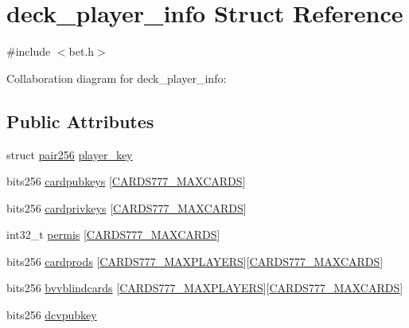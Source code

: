\hypertarget{structdeck__player__info}{}\section{deck\+\_\+player\+\_\+info Struct Reference}
\label{structdeck__player__info}


{\ttfamily \#include $<$bet.\+h$>$}



Collaboration diagram for deck\+\_\+player\+\_\+info\+:
\subsection*{Public Attributes}
\begin{DoxyCompactItemize}
\item 
struct \hyperlink{structpair256}{pair256} \hyperlink{structdeck__player__info_a69c860bb618326b42649fb8dc874b19a}{player\+\_\+key}
\item 
bits256 \hyperlink{structdeck__player__info_a42b58a3d6acbef59ef0951a2b441c1cd}{cardpubkeys} \mbox{[}\hyperlink{common_8h_a90f0ea2d767ac1915e44acb24a1fe1bd}{C\+A\+R\+D\+S777\+\_\+\+M\+A\+X\+C\+A\+R\+DS}\mbox{]}
\item 
bits256 \hyperlink{structdeck__player__info_aace068630cb6fbc45a944df6d533e91e}{cardprivkeys} \mbox{[}\hyperlink{common_8h_a90f0ea2d767ac1915e44acb24a1fe1bd}{C\+A\+R\+D\+S777\+\_\+\+M\+A\+X\+C\+A\+R\+DS}\mbox{]}
\item 
int32\+\_\+t \hyperlink{structdeck__player__info_a3627ccd09a0aeedd9e72dcd69186181b}{permis} \mbox{[}\hyperlink{common_8h_a90f0ea2d767ac1915e44acb24a1fe1bd}{C\+A\+R\+D\+S777\+\_\+\+M\+A\+X\+C\+A\+R\+DS}\mbox{]}
\item 
bits256 \hyperlink{structdeck__player__info_afe50d0d657541e924497e3e16765abf9}{cardprods} \mbox{[}\hyperlink{common_8h_a97d6188fd175f4ea7268e9445107a7c0}{C\+A\+R\+D\+S777\+\_\+\+M\+A\+X\+P\+L\+A\+Y\+E\+RS}\mbox{]}\mbox{[}\hyperlink{common_8h_a90f0ea2d767ac1915e44acb24a1fe1bd}{C\+A\+R\+D\+S777\+\_\+\+M\+A\+X\+C\+A\+R\+DS}\mbox{]}
\item 
bits256 \hyperlink{structdeck__player__info_a8c853de455fc2b5289789287a025cb05}{bvvblindcards} \mbox{[}\hyperlink{common_8h_a97d6188fd175f4ea7268e9445107a7c0}{C\+A\+R\+D\+S777\+\_\+\+M\+A\+X\+P\+L\+A\+Y\+E\+RS}\mbox{]}\mbox{[}\hyperlink{common_8h_a90f0ea2d767ac1915e44acb24a1fe1bd}{C\+A\+R\+D\+S777\+\_\+\+M\+A\+X\+C\+A\+R\+DS}\mbox{]}
\item 
bits256 \hyperlink{structdeck__player__info_addcc08f5394486871a4fbec618c84df9}{dcvpubkey}

\end{DoxyCompactItemize}
